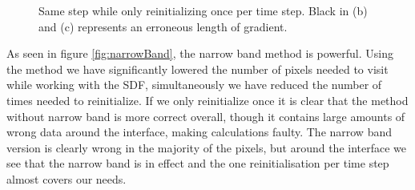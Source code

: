 \begin{figure}[h]
  \centering
  \caption{Same step while only reinitializing once per time step. Black in (b) and (c) represents an erroneous length of gradient.}
  \label{fig:narrowBand}
\end{figure}

As seen in figure \vref{fig:narrowBand}, the narrow band method is
powerful. Using the method we have significantly lowered the number of
pixels needed to visit while working with the SDF, simultaneously we
have reduced the number of times needed to reinitialize. If we only
reinitialize once it is clear that the method without narrow band is
more correct overall, though it contains large amounts of wrong data
around the interface, making calculations faulty. The narrow band
version is clearly wrong in the majority of the pixels, but around the
interface we see that the narrow band is in effect and the one
reinitialisation per time step almost covers our needs. 


